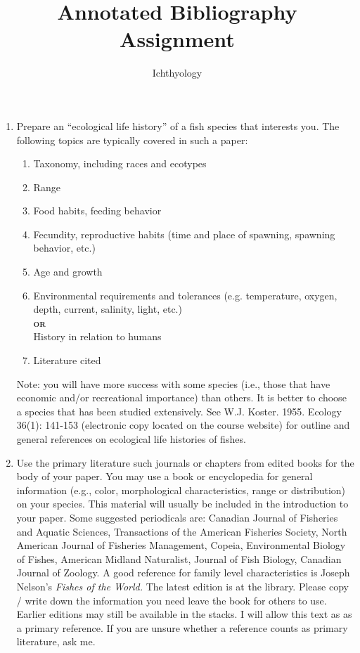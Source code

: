 \documentclass[12pt]{article}
\title{Annotated Bibliography Assignment}
\author{Ichthyology}
\date{}                                           %
\begin{document}
\thispagestyle{plain}

\begin{enumerate}
	\item Prepare an “ecological life history” of a fish species that interests you. The following topics are typically covered in such a paper:

	\begin{enumerate}[label=\alph*.]
	\item	Taxonomy, including races and ecotypes
	\item Range
	\item Food habits, feeding behavior
	\item Fecundity, reproductive habits (time and place of spawning, spawning behavior, etc.)
	\item Age and growth
	\item Environmental requirements and tolerances (e.g. temperature, oxygen, depth, current, salinity, light, etc.)\\%
		\textsc{\textbf{or}}\\%
		History in relation to humans
	\item Literature cited
	\end{enumerate}
	
	Note: you will have more success with some species (i.e., those that have economic and/or recreational importance) than others. It is better to choose a species that has been studied extensively. See W.J. Koster. 1955. Ecology 36(1): 141-153 (electronic copy located on the course website) for outline and general references on ecological life histories of fishes.
	
	\item Use the primary literature such journals or chapters from edited books for the body of your paper. You may use a book or encyclopedia for general information (e.g., color, morphological characteristics, range or distribution) on your species. This material will usually be included in the introduction to your paper. Some suggested periodicals are: Canadian Journal of Fisheries and Aquatic Sciences, Transactions of the American Fisheries Society, North American Journal of Fisheries Management, Copeia, Environmental Biology of Fishes, American Midland Naturalist, Journal of Fish Biology, Canadian Journal of Zoology.  A good reference for family level characteristics is Joseph Nelson’s \textit{Fishes of the World.}  The latest edition is at the library. Please copy / write down the information you need leave the book for others to use.   Earlier editions may still be available in the stacks. I will allow this text as as a primary reference.  If you are unsure whether a reference counts as primary literature, ask me.


\end{enumerate}
\end{document}
